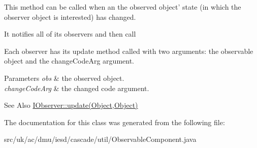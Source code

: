 This method can be called when an the observed object' state (in which the observer object is interested) has changed. 

It notifies all of its observers and then call 

Each observer has its {\ttfamily update} method called with two arguments\-: the observable object and the {\ttfamily change\-Code\-Arg} argument.


\begin{DoxyParams}{Parameters}
{\em obs} & the observed object. \\
\hline
{\em change\-Code\-Arg} & the changed code argument. \\
\hline
\end{DoxyParams}
\begin{DoxySeeAlso}{See Also}
\hyperlink{interfaceuk_1_1ac_1_1dmu_1_1iesd_1_1cascade_1_1util_1_1_i_observer_a4a1251fa996fd058f4f1f61c0e9e57e3}{I\-Observer\-::update(\-Object,\-Object)} 
\end{DoxySeeAlso}


The documentation for this class was generated from the following file\-:\begin{DoxyCompactItemize}
\item 
src/uk/ac/dmu/iesd/cascade/util/Observable\-Component.\-java\end{DoxyCompactItemize}
